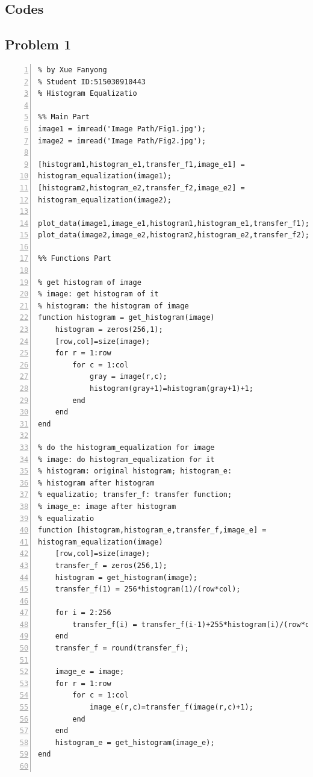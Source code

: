 \documentclass[11pt,oneside]{book}
\begin{document}
\begin{appendices}
\chapter{Codes}
\section{Problem 1}

\begin{lstlisting}[numbers=left, numberstyle=\tiny,keywordstyle=\color{blue!70},commentstyle=\color{red!50!green!50!blue!50},frame=shadowbox, rulesepcolor=\color{red!20!green!20!blue!20}] 
% Problem 1
% by Xue Fanyong
% Student ID:515030910443
% Histogram Equalizatio

%% Main Part
image1 = imread('Image Path/Fig1.jpg');
image2 = imread('Image Path/Fig2.jpg');

[histogram1,histogram_e1,transfer_f1,image_e1] = 
histogram_equalization(image1);
[histogram2,histogram_e2,transfer_f2,image_e2] = 
histogram_equalization(image2);

plot_data(image1,image_e1,histogram1,histogram_e1,transfer_f1);
plot_data(image2,image_e2,histogram2,histogram_e2,transfer_f2);

%% Functions Part

% get histogram of image
% image: get histogram of it
% histogram: the histogram of image
function histogram = get_histogram(image)
    histogram = zeros(256,1);
    [row,col]=size(image);
    for r = 1:row
        for c = 1:col
            gray = image(r,c);
            histogram(gray+1)=histogram(gray+1)+1;
        end
    end
end

% do the histogram_equalization for image
% image: do histogram_equalization for it
% histogram: original histogram; histogram_e: 
% histogram after histogram
% equalizatio; transfer_f: transfer function; 
% image_e: image after histogram
% equalizatio
function [histogram,histogram_e,transfer_f,image_e] = 
histogram_equalization(image)
    [row,col]=size(image);
    transfer_f = zeros(256,1);
    histogram = get_histogram(image);
    transfer_f(1) = 256*histogram(1)/(row*col);
    
    for i = 2:256
        transfer_f(i) = transfer_f(i-1)+255*histogram(i)/(row*col);
    end
    transfer_f = round(transfer_f);
    
    image_e = image;
    for r = 1:row
        for c = 1:col
            image_e(r,c)=transfer_f(image(r,c)+1);
        end
    end
    histogram_e = get_histogram(image_e);
end


\end{lstlisting}
\end{appendices}
\end{document}
